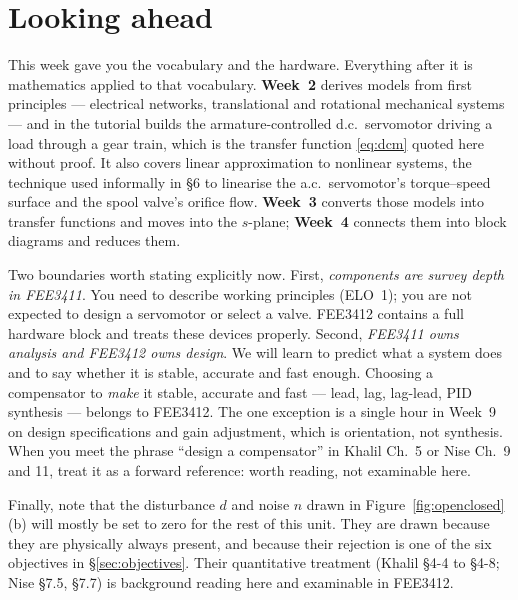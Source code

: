 \documentclass[11pt,a4paper]{article}
\begin{document}
\section*{Looking ahead}

This week gave you the vocabulary and the hardware. Everything after it is
mathematics applied to that vocabulary. \textbf{Week~2} derives models from
first principles --- electrical networks, translational and rotational
mechanical systems --- and in the tutorial builds the armature-controlled d.c.\
servomotor driving a load through a gear train, which is the transfer function
\eqref{eq:dcm} quoted here without proof. It also covers linear approximation
to nonlinear systems, the technique used informally in \S6 to linearise the
a.c.\ servomotor's torque--speed surface and the spool valve's orifice flow.
\textbf{Week~3} converts those models into transfer functions and moves into
the $s$-plane; \textbf{Week~4} connects them into block diagrams and reduces
them.

Two boundaries worth stating explicitly now. First, \emph{components are survey
depth in FEE3411}. You need to describe working principles (ELO~1); you are not
expected to design a servomotor or select a valve. FEE3412 contains a full
hardware block and treats these devices properly. Second, \emph{FEE3411 owns
analysis and FEE3412 owns design}. We will learn to predict what a system does
and to say whether it is stable, accurate and fast enough. Choosing a
compensator to \emph{make} it stable, accurate and fast --- lead, lag,
lag-lead, PID synthesis --- belongs to FEE3412. The one exception is a single
hour in Week~9 on design specifications and gain adjustment, which is
orientation, not synthesis. When you meet the phrase ``design a compensator''
in Khalil Ch.~5 or Nise Ch.~9 and 11, treat it as a forward reference: worth
reading, not examinable here.

Finally, note that the disturbance $d$ and noise $n$ drawn in
Figure~\ref{fig:openclosed}(b) will mostly be set to zero for the rest of this
unit. They are drawn because they are physically always present, and because
their rejection is one of the six objectives in \S\ref{sec:objectives}. Their
quantitative treatment (Khalil \S4-4 to \S4-8; Nise \S7.5, \S7.7) is background
reading here and examinable in FEE3412.
\end{document}
